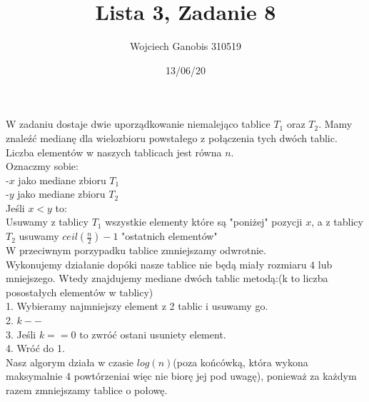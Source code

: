 \documentclass{article}
\title{Lista 3, Zadanie 8}
\author{Wojciech Ganobis 310519}
\date{13/06/20}
\newcommand\tab[1][1cm]{\hspace*{#1}}
\begin{document}
\maketitle

W zadaniu dostaje dwie uporządkowanie niemalejąco tablice $T_{1}$ oraz $T_{2}$. Mamy znaleźć medianę dla wielozbioru powstałego z połączenia tych dwóch tablic. Liczba elementów w naszych tablicach jest równa $n$.\\

Oznaczmy sobie:\\
-$x$ jako mediane zbioru $T_{1}$\\
-$y$ jako mediane zbioru $T_{2}$\\

Jeśli $x < y$ to:\\
\tab Usuwamy z tablicy $T_1$  wszystkie elementy które są "poniżej" pozycji $x$, a z tablicy $T_2$  usuwamy $ceil(\frac{n}2) - 1$ "ostatnich elementów"\\
W przeciwnym porzypadku tablice zmniejszamy odwrotnie.\\

Wykonujemy działanie dopóki nasze tablice nie będą miały rozmiaru $4$ lub mniejszego. Wtedy znajdujemy mediane dwóch tablic metodą:(k to liczba posostałych elementów w tablicy)\\
\tab \tab 1. Wybieramy najmniejszy element z 2 tablic i usuwamy go.\\
\tab \tab 2. $k--$\\
\tab \tab 3.  Jeśli $k == 0$ to zwróć ostani usuniety element.\\
\tab \tab 4. Wróć do 1.\\

Nasz algorym działa w czasie $log(n)$(poza końcówką, która wykona maksymalnie 4 powtórzeniai więc nie biorę jej pod uwagę), ponieważ za każdym razem zmniejszamy tablice o połowę.
\end{document}
